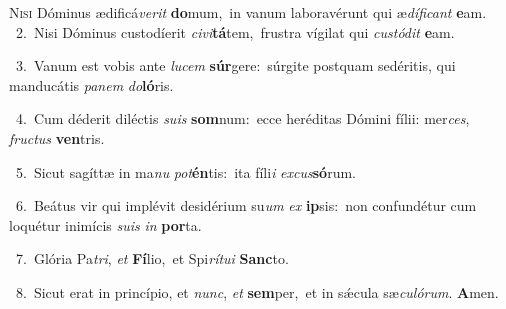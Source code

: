 \lettrine{\initial\textcolor{\initialcolor}{N}}{isi} Dóminus ædificá\-\textit{ve}\-\textit{rit} \textbf{do}\-mum,~\star in vanum laboravérunt qui æ\-\textit{dí}\-\textit{fi}\textit{cant} \textbf{e}\-am.\\
{\numbfont\textcolor{\numbcolor}{~2.}}~Nisi Dóminus custodíerit \textit{ci}\-\textit{vi}\textbf{tá}tem,~\star frustra vígilat qui \textit{cus}\-\textit{tó}\textit{dit} \textbf{e}\-am.\par
{\numbfont\textcolor{\numbcolor}{~3.}}~Vanum est vobis ante \textit{lu}\-\textit{cem} \textbf{súr}\-gere:~\star súrgite postquam sedéritis, qui manducátis \textit{pa}\-\textit{nem} \textit{do}\-\textbf{ló}ris.\par
{\numbfont\textcolor{\numbcolor}{~4.}}~Cum déderit diléctis \textit{su}\-\textit{is} \textbf{som}\-num:~\star ecce heréditas Dómini fílii: mer\-\textit{ces}\-, \textit{fruc}\-\textit{tus} \textbf{ven}\-tris.\par
{\numbfont\textcolor{\numbcolor}{~5.}}~Sicut sagíttæ in ma\textit{nu} \textit{pot}\-\textbf{én}tis:~\star ita fíli\textit{i} \textit{ex}\-\textit{cus}\textbf{só}rum.\par
{\numbfont\textcolor{\numbcolor}{~6.}}~Beátus vir qui implévit desidérium su\textit{um} \textit{ex} \textbf{ip}\-sis:~\star non confundétur cum loquétur inimícis \textit{su}\-\textit{is} \textit{in} \textbf{por}\-ta.\par
{\numbfont\textcolor{\numbcolor}{~7.}}~Glória Pa\-\textit{tri}\-, \textit{et} \textbf{Fí}\-lio,~\star et Spi\-\textit{rí}\-\textit{tu}\textit{i} \textbf{Sanc}\-to.\par
{\numbfont\textcolor{\numbcolor}{~8.}}~Sicut erat in princípio, et \textit{nunc}\-, \textit{et} \textbf{sem}\-per,~\star et in sǽcula sæ\-\textit{cu}\-\textit{ló}\textit{rum}. \textbf{A}\-men.\par
